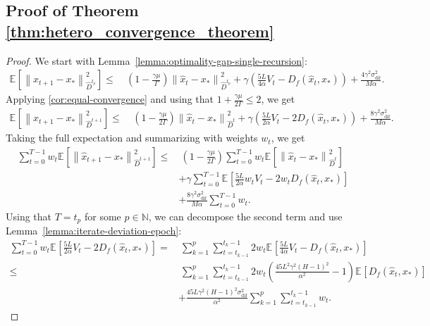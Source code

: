 \documentclass[sn-mathphys,Numbered]{sn-jnl}%
\renewcommand{\|}{\parallel}
\newcommand\ec[2][]{\ensuremath{\mathbb{E}_{#1} \left[#2\right]}}
\newcommand\ecn[3][]{\ec[#1]{\norm{#2}^2_{#3}}}
\newcommand\br[1]{\left ( #1 \right )}
\newcommand{\N}{\mathbb{N}}
\newcommand{\norm}[1]{\left\lVert#1\right\rVert}
\newcommand{\sqn}[1]{{\left\lVert#1\right\rVert}^2}
\newcommand{\sigmaf}{\sigma_{\mathrm{dif}}}
\renewcommand {\*} {\ast}
\begin{document}
\subsection{\bf Proof of Theorem \ref{thm:hetero_convergence_theorem}}
\begin{proof}
    We start with Lemma~\ref{lemma:optimality-gap-single-recursion}:
    \begin{align*}
        \ecn{\hat{x}_{t+1} - x_\ast}{\hat{D}^{t_p}} \leq&\ \br{1 - \frac{\gamma \mu}{\Gamma}} \sqn{\hat{x}_{t} - x_\ast}_{\hat{D}^{t_p}} + \gamma\left(\frac{5L}{4\alpha} V_t - D_{f} (\hat{x}_t, x_\ast)\right) + \frac{4 \gamma^2 \sigmaf^2}{M\alpha}.
    \end{align*}
    Applying \cref{cor:equal-convergence} and using that $1 + \frac{\gamma\mu}{2\Gamma} \leq 2$, we get
    \begin{align*}
        \ecn{\hat{x}_{t+1} - x_\ast}{\hat{D}^{t+1}} \leq&\ \br{1 - \frac{\gamma \mu}{2\Gamma}} \sqn{\hat{x}_{t} - x_\ast}_{\hat{D}^{t}} + \gamma\left(\frac{5L}{2\alpha} V_t - 2D_{f} (\hat{x}_t, x_\ast)\right) + \frac{8 \gamma^2 \sigmaf^2}{M\alpha}.
    \end{align*}
    Taking the full expectation and summarizing with weights $w_t$, we get
    \begin{align}
        \label{eq:thm-lsgd-dd-proof-1}
        \sum_{t=0}^{T-1} w_t \ecn{\hat{x}_{t+1} - x_\ast}{\hat{D}^{t+1}} \leq&\ \br{1 - \frac{\gamma \mu}{2\Gamma}}\sum_{t=0}^{T-1} w_t \ecn{\hat{x}_{t} - x_\ast}{\hat{D}^{t}} \nonumber \\&+ \gamma \sum_{t=0}^{T-1} \ec{\frac{5L}{2\alpha} w_t V_t - 2 w_t D_{f} (\hat{x}_t, x_\ast)} \nonumber \\ &+ \frac{8 \gamma^2 \sigmaf^2}{M\alpha}\sum_{t=0}^{T-1} w_t .
    \end{align}
    Using that $T = t_p$ for some $p \in \N$, we can decompose the second term and use Lemma~\ref{lemma:iterate-deviation-epoch}:
    \begin{align*}
        \sum_{t=0}^{T-1} w_t \ec{\frac{5L}{2\alpha} V_t - 2 D_{f} (\hat{x}_t, x_\ast)} =&\ \sum_{k=1}^{p} \sum_{t=t_{k-1}}^{t_{k} - 1} 2w_t \ec{\frac{5L}{4\alpha} V_t - D_{f} (\hat{x}_t, x_\ast)} \\
        \leq&\ \sum_{k=1}^{p} \sum_{t=t_{k-1}}^{t_k - 1} 2w_t\br{ \frac{45L^2\gamma^2 (H-1)^2}{\alpha^2}  - 1} \ec{D_{f} (\hat{x}_t, x_\ast)} \\ 
        &+ \frac{45L \gamma^2(H-1)^2\sigmaf^2}{\alpha^2}\sum_{k=1}^{p} \sum_{t=t_{k-1}}^{t_k - 1} w_t.
    \end{align*}

\end{proof}
\end{document}

